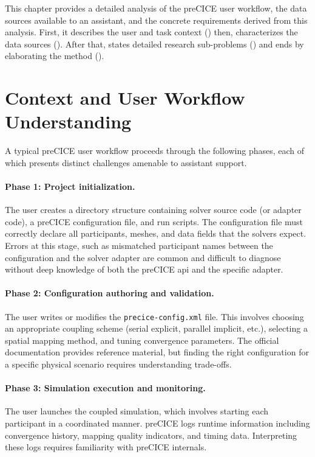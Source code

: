\documentclass[
  numbers=noenddot,
  english,
  a4paper,
  twoside,
  bibliography=totoc,
  headsepline,
  cleardoublepage=empty,
  parskip=half,
  draft=false
]{scrbook}
\theoremstyle{break}
\renewcommand{\_}{\textunderscore\allowbreak}
\begin{document}
This chapter provides a detailed analysis of the preCICE user workflow, the data sources
available to an assistant, and the concrete requirements derived from this analysis. First, 
it describes the user and task context () 
then, characterizes the data sources (). 
After that, states detailed research sub-problems () 
and ends by elaborating the method ().


\section{Context and User Workflow Understanding}\label{sec:problem-exposition:context-understanding}

A typical preCICE user workflow proceeds through the following phases, each of which presents
distinct challenges amenable to assistant support.

\paragraph{Phase 1: Project initialization.}
The user creates a directory structure containing solver source code (or adapter code), a
preCICE configuration file, and run scripts.
The configuration file must correctly declare all participants, meshes, and data fields that the
solvers expect.
Errors at this stage, such as mismatched participant names between the configuration and the
solver adapter are common and difficult to diagnose without deep knowledge of both the
preCICE \gls{api} and the specific adapter.

\paragraph{Phase 2: Configuration authoring and validation.}
The user writes or modifies the \texttt{precice-config.xml} file.
This involves choosing an appropriate coupling scheme (serial explicit, parallel implicit, etc.),
selecting a spatial mapping method, and tuning convergence parameters.
The official documentation provides reference material, but finding the right configuration for
a specific physical scenario requires understanding trade-offs.

\paragraph{Phase 3: Simulation execution and monitoring.}
The user launches the coupled simulation, which involves starting each participant in a
coordinated manner.
preCICE logs runtime information including convergence history, mapping quality indicators,
and timing data.
Interpreting these logs requires familiarity with preCICE internals.
\end{document}
